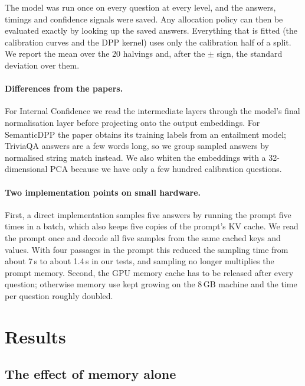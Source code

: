 \documentclass[11pt,a4paper]{article}
\begin{document}
The model was run once on every question at every level, and the answers,
timings and confidence signals were saved. Any allocation policy can then be
evaluated exactly by looking up the saved answers. Everything that is fitted
(the calibration curves and the DPP kernel) uses only the calibration half of a
split. We report the mean over the 20 halvings and, after the $\pm$ sign, the
standard deviation over them.

\paragraph{Differences from the papers.} For Internal Confidence we read the
intermediate layers through the model's final normalisation layer before
projecting onto the output embeddings. For SemanticDPP the paper obtains its
training labels from an entailment model; TriviaQA answers are a few words
long, so we group sampled answers by normalised string match instead. We also
whiten the embeddings with a 32-dimensional PCA because we have only a few
hundred calibration questions.

\paragraph{Two implementation points on small hardware.} First, a direct
implementation samples five answers by running the prompt five times in a
batch, which also keeps five copies of the prompt's KV cache. We read the
prompt once and decode all five samples from the same cached keys and values.
With four passages in the prompt this reduced the sampling time from about
7\,s to about 1.4\,s in our tests, and sampling no longer multiplies the prompt
memory. Second, the GPU memory cache has to be released after every question;
otherwise memory use kept growing on the 8\,GB machine and the time per
question roughly doubled.

\section{Results}

\subsection{The effect of memory alone}
\end{document}
